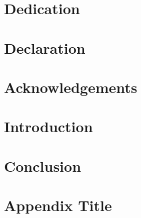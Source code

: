 \documentclass[a4paper,12pt]{report}
\begin{document}



\chapter*{Dedication}

\chapter*{Declaration}

\chapter*{Acknowledgements}


\tableofcontents
\listoffigures
\listoftables

\chapter{Introduction}

\chapter{Conclusion}


\appendix

\chapter{Appendix Title}


\printbibliography

\end{document}
